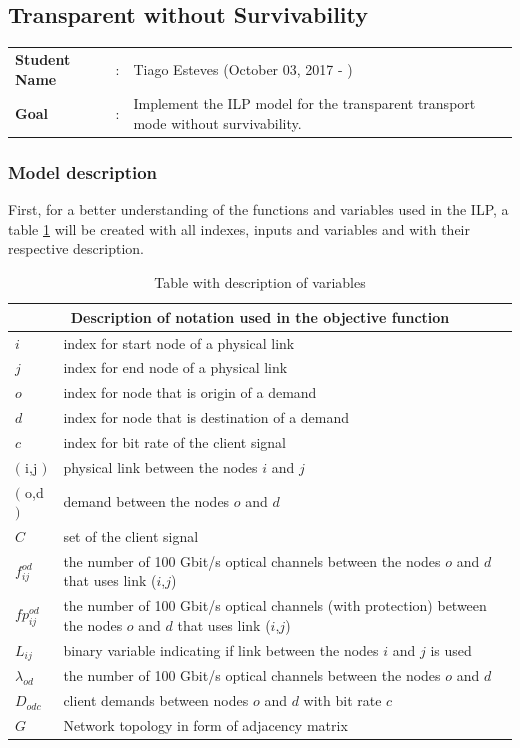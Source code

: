 \clearpage

\subsection{Transparent without Survivability}\label{ILP_Transp_Survivability}
\begin{tcolorbox}	
\begin{tabular}{p{2.75cm} p{0.2cm} p{10.5cm}} 	
\textbf{Student Name}  &:& Tiago Esteves    (October 03, 2017 - )\\
\textbf{Goal}          &:& Implement the ILP model for the transparent transport mode without survivability.
\end{tabular}
\end{tcolorbox}

\subsubsection{Model description}

First, for a better understanding of the functions and variables used in the ILP, a table \ref{description_transp} will be created with all indexes, inputs and variables and with their respective description.

\begin{table}[h!]
\centering
\begin{tabular}{ |p{1cm}||p{13cm}|}
 \hline
 \multicolumn{2}{|c|}{Description of notation used in the objective function} \\
 \hline
 \hline
 $i$ & index for start node of a physical link \\
 $j$ & index for end node of a physical link \\
 $o$ & index for node that is origin of a demand \\
 $d$ & index for node that is destination of a demand \\
 $c$ & index for bit rate of the client signal \\
 $($ i,j $)$ & physical link between the nodes $i$ and $j$ \\
 $($ o,d $)$ & demand between the nodes $o$ and $d$ \\
 $C$ & set of the client signal \\
 $f_{ij}^{od}$ & the number of 100 Gbit/s optical channels between the nodes $o$ and $d$ that uses link ($i$,$j$) \\
 $fp_{ij}^{od}$ & the number of 100 Gbit/s optical channels (with protection) between the nodes $o$ and $d$ that uses link ($i$,$j$) \\
 $L_{ij}$ & binary variable indicating if link between the nodes $i$ and $j$ is used \\
 $\lambda_{od}$ & the number of 100 Gbit/s optical channels between the nodes $o$ and $d$ \\
 $D_{odc}$ & client demands between nodes $o$ and $d$ with bit rate $c$ \\
 $G$ & Network topology in form of adjacency matrix \\
 \hline
\end{tabular}
\caption{Table with description of variables}
\label{description_transp}
\end{table}

